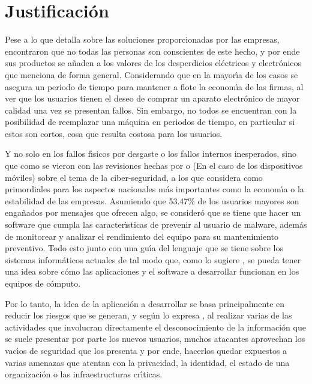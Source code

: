 \pagebreak
\section{Justificaci\'on}

Pese a lo que \textcite{Herat2020} detalla sobre las soluciones proporcionadas
por las empresas, \textcite{Hartl2023} encontraron que no todas las personas son
conscientes de este hecho, y por ende sus productos se a\~naden a los valores de
los desperdicios el\'ectricos y electr\'onicos que \textcite{Seif2024} menciona de
forma general. Considerando que en la mayor\'{\i}a de los casos se asegura un periodo
de tiempo para mantener a flote la econom\'{\i}a de las firmas, al ver que los
usuarios tienen el deseo de comprar un aparato electr\'onico de mayor calidad una
vez se presentan fallos. Sin embargo, no todos se encuentran con la posibilidad
de reemplazar una m\'aquina en periodos de tiempo, en particular si estos son
cortos, cosa que resulta costosa para los usuarios.

Y no solo en los fallos f\'{\i}sicos por desgaste o los fallos internos inesperados,
sino que como se vieron con las revisiones hechas por \textcite{Rathore2023} o
\textcite{Waqar2023} (En el caso de los dispositivos m\'oviles) sobre el tema de
la ciber-seguridad, a los que \textcite{CanoMartinez2022} considera como
primordiales para los aspectos nacionales m\'as importantes como la econom\'{\i}a o la
estabilidad de las empresas. Asumiendo que 53.47\% de los usuarios
mayores son enga\~nados por mensajes que ofrecen algo, se consider\'o que se tiene
que hacer un software que cumpla las caracter\'{\i}sticas de prevenir al usuario de
malware, adem\'as de monitorear y analizar el rendimiento del equipo para su
mantenimiento preventivo. Todo esto junto con una gu\'{\i}a del lenguaje que se tiene
sobre los sistemas inform\'aticos actuales de tal modo que, como lo sugiere
\textcite{Nurul2021}, se pueda tener una idea sobre c\'omo las aplicaciones y el
software a desarrollar funcionan en los equipos de c\'omputo.

Por lo tanto, la idea de la aplicaci\'on a desarrollar se basa principalmente en
reducir los riesgos que se generan, y seg\'un lo expresa \textcite{Mosquera2019},
al realizar varias de las actividades que involucran directamente el
desconocimiento de la informaci\'on que se suele presentar por parte los nuevos
usuarios, muchos atacantes aprovechan los vac\'{\i}os de seguridad que los presenta
y por ende, hacerlos quedar expuestos a varias amenazas que atentan con la
privacidad, la identidad, el estado de una organizaci\'on o las infraestructuras
cr\'{\i}ticas. \parencite[e.g.,][]{CanoMartinez2022}
